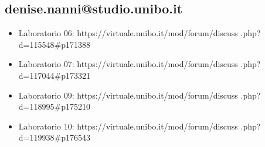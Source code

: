 \documentclass{article}
\begin{document}
\subsection{denise.nanni@studio.unibo.it}
\begin{itemize}
    \item Laboratorio 06: https://virtuale.unibo.it/mod/forum/discuss
    .php?d=115548\#p171388
    \item Laboratorio 07: https://virtuale.unibo.it/mod/forum/discuss
    .php?d=117044\#p173321
    \item Laboratorio 09: https://virtuale.unibo.it/mod/forum/discuss
    .php?d=118995\#p175210
    \item Laboratorio 10: https://virtuale.unibo.it/mod/forum/discuss
    .php?d=119938\#p176543
\end{itemize}
\end{document}
